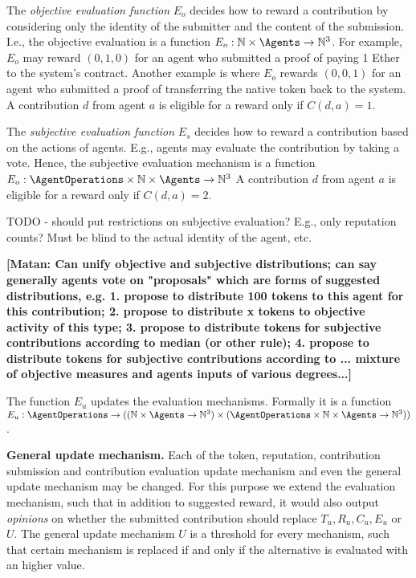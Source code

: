 \documentclass[10pt]{llncs}
\newcommand{\nat}{\mathbb{N}}
\newcommand{\MyComment}[1]{{\textbf{\color{blue} [Matan: #1]}}}
\begin{document}
The \emph{objective evaluation function} $E_o$ decides how to reward a contribution by considering only the identity of the submitter and the content of the submission.
I.e., the objective evaluation is a function $E_o : \nat \times \Agents \to \nat^3$.
For example, $E_o$ may reward $(0,1,0)$ for an agent who submitted a proof of paying 1 Ether to the system's contract.
Another example is where $E_o$ rewards $(0,0,1)$ for an agent who submitted a proof of transferring the native token back to the system.
A contribution $d$ from agent $a$ is eligible for a reward only if $C(d,a)=1$.

The \emph{subjective evaluation function} $E_s$ decides how to reward a contribution based on the actions of agents.
E.g., agents may evaluate the contribution by taking a vote.
Hence, the subjective evaluation mechanism is a function 
$E_o : \AgentOperations \times \nat \times \Agents \to \nat^3$
A contribution $d$ from agent $a$ is eligible for a reward only if $C(d,a)=2$.

TODO - should put restrictions on subjective evaluation? E.g., only reputation counts? Must be blind to the actual identity of the agent, etc.

\MyComment{Can unify objective and subjective distributions; can say generally agents vote on "proposals" which are forms of suggested distributions, e.g. 1. propose to distribute 100 tokens to this agent for this contribution; 2. propose to distribute x tokens to objective activity of this type; 3. propose to distribute tokens for subjective contributions according to median (or other rule); 4. propose to distribute tokens for subjective contributions according to ... mixture of objective measures and agents inputs of various degrees...}

The function $E_u$ updates the evaluation mechanisms.
Formally it is a function $E_u : \AgentOperations \to ((\nat \times \Agents \to \nat^3)\times(\AgentOperations \times \nat \times \Agents \to \nat^3))$.

\noindent \textbf{General update mechanism.}
Each of the token, reputation, contribution submission and contribution evaluation update mechanism and even the general update mechanism may be changed.
For this purpose we extend the evaluation mechanism, such that in addition to suggested reward, it would also output \emph{opinions} on whether the submitted contribution should replace $T_u, R_u, C_u, E_u$ or $U$.
The general update mechanism $U$ is a threshold for every mechanism, such that certain mechanism is replaced if and only if the alternative is evaluated with an higher value.
\end{document}
